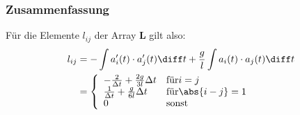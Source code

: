 \subsubsection{Zusammenfassung} %
Für die Elemente $l_{ij}$ der Array $\mathbf{L}$ gilt also:
\begin{equation}
    \begin{aligned}
        l_{ij} 
        &= - \int a_i'(t) \cdot a_j'(t) \diff t + \frac{g}{l} \int a_i(t) \cdot a_j(t) \diff t \\
        &=  \left\{ 
                \begin{array}{ll}
                    - \frac{2}{\Delta t} + \frac{2g}{3l} \Delta t & \mbox{für} i = j \\
                    \frac{1}{\Delta t} + \frac{g}{6l} \Delta t & \mbox{für} \abs{i - j} = 1 \\
                    0 & \mbox{sonst}
                \end{array} 
            \right.
    \end{aligned}
\end{equation}